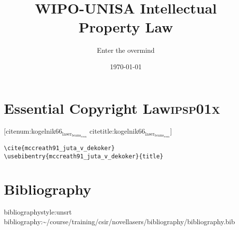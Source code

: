 \documentclass[11pt]{article}
\author{Enter the overmind}
\date{\today}
\title{WIPO-UNISA Intellectual Property Law}
\begin{document}
\maketitle
\tableofcontents


\section{Essential Copyright Law\hfill{}\textsc{ipsp01x}}
\label{sec:org2b217f4}
[citenum:kogelnik66\(_{\text{laser}}_{\text{beams}}_{\text{reson}}\) citetitle:kogelnik66\(_{\text{laser}}_{\text{beams}}_{\text{reson}}\)]

\begin{verbatim}
\cite{mccreath91_juta_v_dekoker} \usebibentry{mccreath91_juta_v_dekoker}{title}
\end{verbatim}


\section{Bibliography}
\label{sec:org00cda3f}
bibliographystyle:unsrt
bibliography:\textasciitilde{}/course/training/csir/novellasers/bibliography/bibliography.bib
\end{document}
